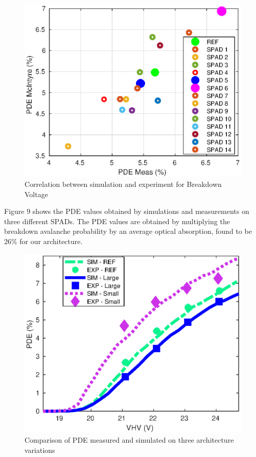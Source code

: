 \documentclass[10pt,a4paper,twocolumn]{article}
\begin{document}
\begin{figure}[h]
\centering
\includegraphics[scale=0.65]{../pictures/000_McIntyre_Bench_GR5_graphs_corel.eps}
\caption{Correlation between simulation and experiment for Breakdown Voltage}
\end{figure}

Figure 9 shows the PDE values obtained by simulations and measurements on three different SPADs. The PDE values are obtained by multiplying the breakdown avalanche probability by an average optical absorption, found to be 26\% for our architecture.

\begin{figure}[h!]
\centering
\includegraphics[scale=0.69]{../pictures/000_McIntyre_Bench_GR5_graphs.eps}
\caption{Comparison of PDE measured and simulated on three architecture variations}
\end{figure}
\end{document}
